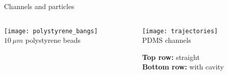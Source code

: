 \begin{frame}[c]{Channels and particles}

	\begin{columns}[t]
		\begin{column}[T]{2.25in}
			{\centering 
				\texttt{[image: polystyrene\_bangs]} \\
				$\SI{10}{\mu m}$ polystyrene beads \\
				\par
			}		 
		\end{column}
		
		\begin{column}[T]{2.25in}
			{\centering 
				\texttt{[image: trajectories]} \\
				PDMS channels \\
				{\footnotesize
					\textbf{Top row:} straight \\
					\textbf{Bottom row:} with cavity \\
					\par
				}
			}		 
		\end{column}
	\end{columns}	

\end{frame}





